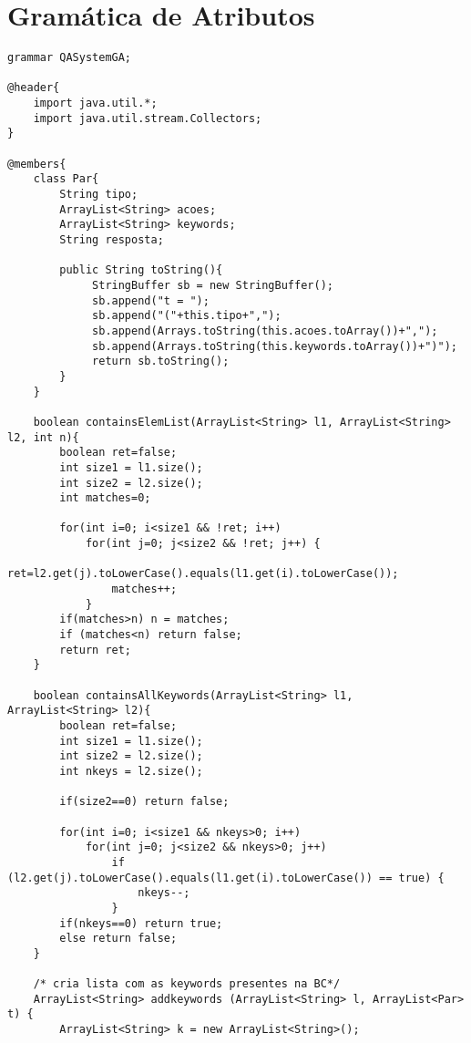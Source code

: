 \section{Gramática de Atributos} \label{GA}
\small
\begin{changemargin}{-3cm}{0cm}
\begin{verbatim}
grammar QASystemGA;

@header{
    import java.util.*;
    import java.util.stream.Collectors;
}

@members{
    class Par{
        String tipo;
        ArrayList<String> acoes;
        ArrayList<String> keywords;
        String resposta;
                      
        public String toString(){
             StringBuffer sb = new StringBuffer();
             sb.append("t = ");
             sb.append("("+this.tipo+",");
             sb.append(Arrays.toString(this.acoes.toArray())+",");
             sb.append(Arrays.toString(this.keywords.toArray())+")");
             return sb.toString();
        }
    }
         
    boolean containsElemList(ArrayList<String> l1, ArrayList<String> l2, int n){
        boolean ret=false;
        int size1 = l1.size();
        int size2 = l2.size();
        int matches=0;
        
        for(int i=0; i<size1 && !ret; i++)
            for(int j=0; j<size2 && !ret; j++) {
                ret=l2.get(j).toLowerCase().equals(l1.get(i).toLowerCase());
                matches++;
            }
        if(matches>n) n = matches;
        if (matches<n) return false;
        return ret;
    }

    boolean containsAllKeywords(ArrayList<String> l1, ArrayList<String> l2){
        boolean ret=false;
        int size1 = l1.size();
        int size2 = l2.size();
        int nkeys = l2.size();
        
        if(size2==0) return false;
                  
        for(int i=0; i<size1 && nkeys>0; i++)
            for(int j=0; j<size2 && nkeys>0; j++)
                if (l2.get(j).toLowerCase().equals(l1.get(i).toLowerCase()) == true) {
                    nkeys--; 
                }
        if(nkeys==0) return true;
        else return false;           
    }

    /* cria lista com as keywords presentes na BC*/
    ArrayList<String> addkeywords (ArrayList<String> l, ArrayList<Par> t) {
        ArrayList<String> k = new ArrayList<String>();
        

\end{verbatim}
\end{changemargin}
